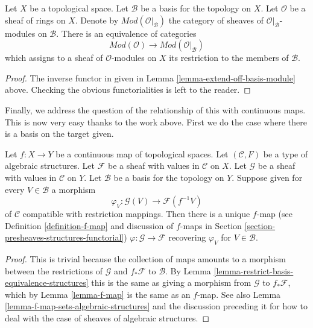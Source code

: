 \begin{lemma}
\label{lemma-restrict-basis-equivalence-modules}
Let $X$ be a topological space.
Let $\mathcal{B}$ be a basis for the topology on $X$.
Let $\mathcal{O}$ be a sheaf of rings on $X$.
Denote by $\textit{Mod}(\mathcal{O}|_\mathcal{B})$ the category of
sheaves of $\mathcal{O}|_\mathcal{B}$-modules on $\mathcal{B}$.
There is an equivalence of categories
$$
\textit{Mod}(\mathcal{O})
\longrightarrow
\textit{Mod}(\mathcal{O}|_\mathcal{B})
$$
which assigns to a sheaf of $\mathcal{O}$-modules on $X$ its restriction to
the members of $\mathcal{B}$.
\end{lemma}

\begin{proof}
The inverse functor in given in
Lemma \ref{lemma-extend-off-basis-module} above.
Checking the obvious functorialities is left to the reader.
\end{proof}

\noindent
Finally, we address the question of the relationship of this with
continuous maps. This is now very easy thanks to the work
above. First we do the case where there is a basis on the
target given.

\begin{lemma}
\label{lemma-f-map-basis-below-structures}
Let $f : X \to Y$ be a continuous map of topological spaces.
Let $(\mathcal{C}, F)$ be a type of algebraic structures.
Let $\mathcal{F}$ be a sheaf with values in $\mathcal{C}$ on $X$.
Let $\mathcal{G}$ be a sheaf with values in $\mathcal{C}$ on $Y$.
Let $\mathcal{B}$ be a basis for the topology on $Y$.
Suppose given for every $V \in \mathcal{B}$ a morphism
$$
\varphi_V :
\mathcal{G}(V)
\longrightarrow
\mathcal{F}(f^{-1}V)
$$
of $\mathcal{C}$ compatible with restriction mappings.
Then there is a unique $f$-map (see Definition \ref{definition-f-map}
and discussion of $f$-maps in
Section \ref{section-presheaves-structures-functorial})
$\varphi : \mathcal{G} \to \mathcal{F}$
recovering $\varphi_V$ for $V \in \mathcal{B}$.
\end{lemma}

\begin{proof}
This is trivial because the collection of maps
amounts to a morphism between the restrictions
of $\mathcal{G}$ and $f_*\mathcal{F}$ to $\mathcal{B}$.
By Lemma \ref{lemma-restrict-basis-equivalence-structures}
this is the same as giving a morphism from $\mathcal{G}$
to $f_*\mathcal{F}$, which by Lemma \ref{lemma-f-map}
is the same as an $f$-map. See also
Lemma \ref{lemma-f-map-sets-algebraic-structures}
and the discussion preceding it
for how to deal with the case of sheaves of algebraic structures.
\end{proof}

